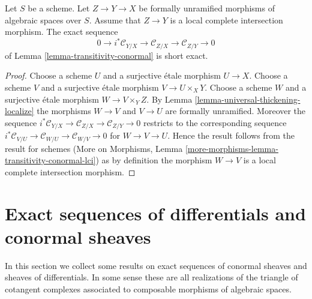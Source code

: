 \begin{lemma}
\label{lemma-transitivity-conormal-lci}
Let $S$ be a scheme. Let $Z \to Y \to X$ be formally unramified morphisms
of algebraic spaces over $S$. Assume that $Z \to Y$ is a local complete
intersection morphism. The exact sequence
$$
0 \to i^*\mathcal{C}_{Y/X} \to
\mathcal{C}_{Z/X} \to
\mathcal{C}_{Z/Y} \to 0
$$
of
Lemma \ref{lemma-transitivity-conormal}
is short exact.
\end{lemma}

\begin{proof}
Choose a scheme $U$ and a surjective \'etale morphism $U \to X$.
Choose a scheme $V$ and a surjective \'etale morphism $V \to U \times_X Y$.
Choose a scheme $W$ and a surjective \'etale morphism $W \to V \times_Y Z$.
By
Lemma \ref{lemma-universal-thickening-localize}
the morphisms $W \to V$ and $V \to U$ are formally unramified.
Moreover the sequence
$i^*\mathcal{C}_{Y/X} \to \mathcal{C}_{Z/X} \to \mathcal{C}_{Z/Y} \to 0$
restricts to the corresponding sequence
$i^*\mathcal{C}_{V/U} \to \mathcal{C}_{W/U} \to \mathcal{C}_{W/V} \to 0$
for $W \to V \to U$. Hence the result follows from the result for schemes
(More on Morphisms, Lemma \ref{more-morphisms-lemma-transitivity-conormal-lci})
as by definition the morphism $W \to V$ is a local complete intersection
morphism.
\end{proof}








\section{Exact sequences of differentials and conormal sheaves}
\label{section-exact}

\noindent
In this section we collect some results on exact sequences of conormal
sheaves and sheaves of differentials. In some sense these are all
realizations of the triangle of cotangent complexes associated to
composable morphisms of algebraic spaces.

